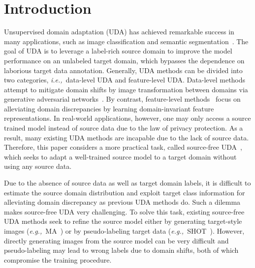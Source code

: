 \documentclass{article}
\def\ie{\emph{i.e.,~}}
\def\eg{\emph{e.g.,~}}
\begin{document}
\section{Introduction}
Unsupervised domain adaptation (UDA) has achieved remarkable success in many applications, such as image classification and semantic segmentation~\cite{Yan2017LearningDC,Liang2019DistantSC,tang2020unsupervised,Zhang2020CollaborativeUD}. 
The goal of UDA is to leverage a label-rich source domain to improve the model performance on an unlabeled target domain, which bypasses the dependence on laborious target data annotation.
Generally, UDA methods can be divided into two categories, \ie data-level UDA and feature-level UDA. Data-level methods~\cite{Sankaranarayanan2018GenerateTA,Hoffman2018CyCADACA} attempt to mitigate domain shifts by image transformation between domains via generative adversarial networks~\cite{goodfellow2014generative}. 
By contrast, feature-level methods~\cite{ganin2015unsupervised,Wei2016DeepNF} focus on alleviating domain discrepancies by learning domain-invariant feature representations. In real-world applications, however, one may only access a source trained model instead of source data due to the law of privacy protection. As a result, many existing UDA methods are incapable due to the lack of source data. Therefore, this paper considers a more practical task, called source-free UDA~\cite{liang2020shot,Li2020ModelAU}, which seeks to adapt a well-trained source model to a target domain without using any source data.


Due to the absence of source data as well as target domain labels, it is difficult to estimate the source domain distribution and exploit target class information for alleviating domain discrepancy as previous UDA methods do. Such a dilemma makes source-free UDA very challenging. To solve this task, existing source-free UDA methods seek to refine the source model either by generating target-style images (\eg MA~\cite{Li2020ModelAU}) or by pseudo-labeling target data (\eg SHOT~\cite{liang2020shot}). However, directly generating images from the source model can be very difficult and pseudo-labeling may lead to wrong labels due to domain shifts, both of which compromise the training procedure.
\end{document}
